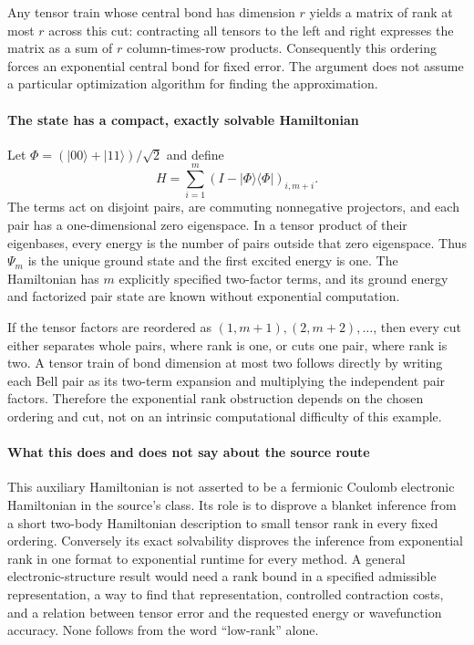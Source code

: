 \documentclass[11pt]{article}
\begin{document}
Any tensor train whose central bond has dimension $r$ yields a matrix of rank at most $r$ across this cut: contracting all tensors to the left and right expresses the matrix as a sum of $r$ column-times-row products. Consequently this ordering forces an exponential central bond for fixed error. The argument does not assume a particular optimization algorithm for finding the approximation.

\paragraph{The state has a compact, exactly solvable Hamiltonian}
Let $\Phi=(|00\rangle+|11\rangle)/\sqrt2$ and define
\[
 H=\sum_{i=1}^m\left(I-|\Phi\rangle\langle\Phi|\right)_{i,m+i}.
\]
The terms act on disjoint pairs, are commuting nonnegative projectors, and each pair has a one-dimensional zero eigenspace. In a tensor product of their eigenbases, every energy is the number of pairs outside that zero eigenspace. Thus $\Psi_m$ is the unique ground state and the first excited energy is one. The Hamiltonian has $m$ explicitly specified two-factor terms, and its ground energy and factorized pair state are known without exponential computation.

If the tensor factors are reordered as $(1,m+1),(2,m+2),\ldots$, then every cut either separates whole pairs, where rank is one, or cuts one pair, where rank is two. A tensor train of bond dimension at most two follows directly by writing each Bell pair as its two-term expansion and multiplying the independent pair factors. Therefore the exponential rank obstruction depends on the chosen ordering and cut, not on an intrinsic computational difficulty of this example.

\paragraph{What this does and does not say about the source route}
This auxiliary Hamiltonian is not asserted to be a fermionic Coulomb electronic Hamiltonian in the source's class. Its role is to disprove a blanket inference from a short two-body Hamiltonian description to small tensor rank in every fixed ordering. Conversely its exact solvability disproves the inference from exponential rank in one format to exponential runtime for every method. A general electronic-structure result would need a rank bound in a specified admissible representation, a way to find that representation, controlled contraction costs, and a relation between tensor error and the requested energy or wavefunction accuracy. None follows from the word ``low-rank'' alone.
\end{document}
